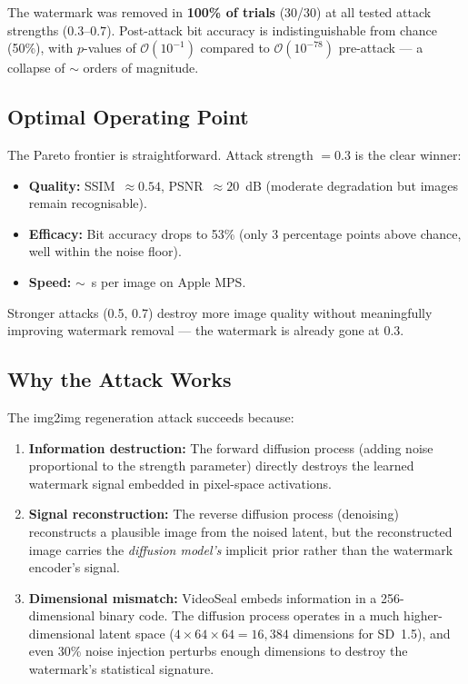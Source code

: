 \documentclass[11pt,a4paper]{article}
\begin{document}
The watermark was removed in \textbf{100\% of trials} (30/30) at all
tested attack strengths ($0.3$--$0.7$). Post-attack bit accuracy is
indistinguishable from chance (50\%), with $p$-values of $\mathcal{O}(10^{-1})$
compared to $\mathcal{O}(10^{-78})$ pre-attack --- a collapse of
$\sim$ orders of magnitude.

\subsection{Optimal Operating Point}

The Pareto frontier is straightforward. Attack strength $= 0.3$ is the
clear winner:

\begin{itemize}
    \item \textbf{Quality:} SSIM~$\approx 0.54$, PSNR~$\approx 20$~dB
    (moderate degradation but images remain recognisable).
    \item \textbf{Efficacy:} Bit accuracy drops to 53\% (only 3
    percentage points above chance, well within the noise floor).
    \item \textbf{Speed:} $\sim$~s per image on Apple MPS.
\end{itemize}

Stronger attacks (0.5, 0.7) destroy more image quality without
meaningfully improving watermark removal --- the watermark is already gone
at 0.3.

\subsection{Why the Attack Works}

The img2img regeneration attack succeeds because:

\begin{enumerate}
    \item \textbf{Information destruction:} The forward diffusion process
    (adding noise proportional to the strength parameter) directly
    destroys the learned watermark signal embedded in pixel-space
    activations.
    \item \textbf{Signal reconstruction:} The reverse diffusion process
    (denoising) reconstructs a plausible image from the noised latent,
    but the reconstructed image carries the \emph{diffusion model's}
    implicit prior rather than the watermark encoder's signal.
    \item \textbf{Dimensional mismatch:} VideoSeal embeds information in
    a 256-dimensional binary code. The diffusion process operates in a
    much higher-dimensional latent space ($4 \times 64 \times 64 =
    16{,}384$ dimensions for SD~1.5), and even 30\% noise injection
    perturbs enough dimensions to destroy the watermark's statistical
    signature.
\end{enumerate}
\end{document}
